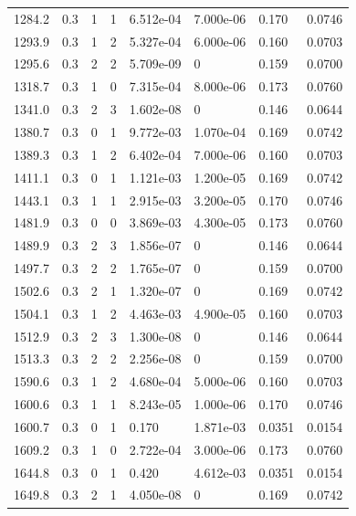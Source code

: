 \documentclass[preview]{standalone}
\begin{document}
{{{\begin{tabular}{L{1.2cm}C{1.2cm} C{0.3cm}C{0.5cm} C{1.4cm}C{1.4cm} C{1.4cm}C{1.4cm}}
  1284.2  &   0.3  & 1     &  1 &  6.512e-04  & 7.000e-06  & 0.170 &  0.0746   \\ 
  1293.9  &   0.3  & 1     &  2 &  5.327e-04  & 6.000e-06  & 0.160 &  0.0703   \\ 
  1295.6  &   0.3  & 2     &  2 &  5.709e-09  & 0  & 0.159 &  0.0700   \\ 
  1318.7  &   0.3  & 1     &  0 &  7.315e-04  & 8.000e-06  & 0.173 &  0.0760   \\ 
  1341.0  &   0.3  & 2     &  3 &  1.602e-08  & 0  & 0.146 &  0.0644   \\ 
  1380.7  &   0.3  & 0     &  1 &  9.772e-03  & 1.070e-04  & 0.169 &  0.0742   \\ 
  1389.3  &   0.3  & 1     &  2 &  6.402e-04  & 7.000e-06  & 0.160 &  0.0703   \\ 
  1411.1  &   0.3  & 0     &  1 &  1.121e-03  & 1.200e-05  & 0.169 &  0.0742   \\ 
  1443.1  &   0.3  & 1     &  1 &  2.915e-03  & 3.200e-05  & 0.170 &  0.0746   \\ 
  1481.9  &   0.3  & 0     &  0 &  3.869e-03  & 4.300e-05  & 0.173 &  0.0760   \\ 
  1489.9  &   0.3  & 2     &  3 &  1.856e-07  & 0  & 0.146 &  0.0644   \\ 
  1497.7  &   0.3  & 2     &  2 &  1.765e-07  & 0  & 0.159 &  0.0700   \\ 
  1502.6  &   0.3  & 2     &  1 &  1.320e-07  & 0  & 0.169 &  0.0742   \\ 
  1504.1  &   0.3  & 1     &  2 &  4.463e-03  & 4.900e-05  & 0.160 &  0.0703   \\ 
  1512.9  &   0.3  & 2     &  3 &  1.300e-08  & 0  & 0.146 &  0.0644   \\ 
  1513.3  &   0.3  & 2     &  2 &  2.256e-08  & 0  & 0.159 &  0.0700   \\ 
  1590.6  &   0.3  & 1     &  2 &  4.680e-04  & 5.000e-06  & 0.160 &  0.0703   \\ 
  1600.6  &   0.3  & 1     &  1 &  8.243e-05  & 1.000e-06  & 0.170 &  0.0746   \\ 
  1600.7  &   0.3  & 0     &  1 &  0.170  & 1.871e-03  & 0.0351 &  0.0154   \\ 
  1609.2  &   0.3  & 1     &  0 &  2.722e-04  & 3.000e-06  & 0.173 &  0.0760   \\ 
  1644.8  &   0.3  & 0     &  1 &  0.420  & 4.612e-03  & 0.0351 &  0.0154   \\ 
  1649.8  &   0.3  & 2     &  1 &  4.050e-08  & 0  & 0.169 &  0.0742   \\ 

\end{tabular}}}}
\end{document}

